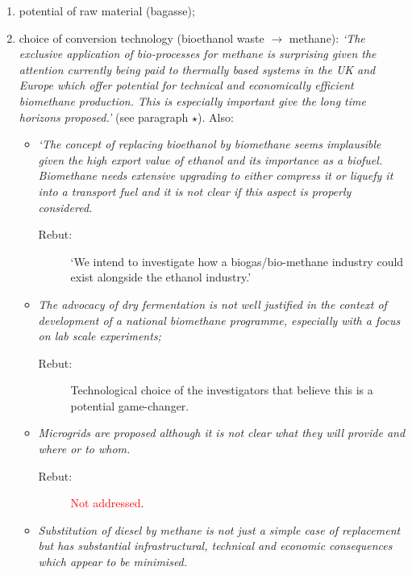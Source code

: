\documentclass[14pt,twoside]{report}
\begin{document}
\begin{enumerate}[(i)]
\begin{description}
\begin{enumerate}
                \item potential of raw material (bagasse);
                \item choice of conversion technology (bioethanol waste $\rightarrow$ methane): {\it `The exclusive application of bio-processes for methane is surprising given the attention currently being paid to thermally based systems in the UK and Europe which offer potential for technical and economically efficient biomethane production. This is especially important give the long time horizons proposed.'} (see paragraph $\star$). Also:
                   \begin{itemize}
                       \item {\it `The concept of replacing bioethanol by biomethane seems implausible given the high export value of ethanol and its importance as a biofuel. Biomethane needs extensive upgrading to either compress it or liquefy it into a transport fuel and it is not clear if this aspect is properly considered. } 
                          \begin{description}
                            \item[Rebut:] `We intend to investigate how a biogas/bio-methane industry could exist alongside the ethanol industry.'
                          \end{description}
                       \item {\it The advocacy of dry fermentation is not well justified in the context of development of a national biomethane programme, especially with a focus on lab scale experiments;}
                          \begin{description}
                            \item[Rebut:] Technological choice of the investigators that believe this is a potential game-changer.
                          \end{description}
                       \item {\it Microgrids are proposed although it is not clear what they will provide and where or to whom.}
                          \begin{description}
                            \item[Rebut:] \textcolor{red}{Not addressed}.
                          \end{description}
                       \item {\it Substitution of diesel by methane is not just a simple case of replacement but has substantial infrastructural, technical and economic consequences which appear to be minimised.}

\end{itemize}
\end{enumerate}
\end{description}
\end{enumerate}
\end{document}
